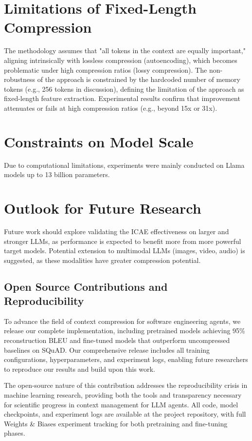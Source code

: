 \section{Limitations of Fixed-Length Compression}

The methodology assumes that "all tokens in the context are equally important," aligning intrinsically with lossless compression (autoencoding), which becomes problematic under high compression ratios (lossy compression).
The non-robustness of the approach is constrained by the hardcoded number of memory tokens (e.g., 256 tokens in discussion), defining the limitation of the approach as fixed-length feature extraction.
Experimental results confirm that improvement attenuates or fails at high compression ratios (e.g., beyond 15x or 31x).


\section{Constraints on Model Scale}

Due to computational limitations, experiments were mainly conducted on Llama models up to 13 billion parameters.


\section{Outlook for Future Research}

Future work should explore validating the ICAE \cite{ge_-context_2024} effectiveness on larger and stronger LLMs, as performance is expected to benefit more from more powerful target models.
Potential extension to multimodal LLMs (images, video, audio) is suggested, as these modalities have greater compression potential.

\subsection{Open Source Contributions and Reproducibility}

To advance the field of context compression for software engineering agents, we release our complete implementation, including pretrained models achieving 95\% reconstruction BLEU and fine-tuned models that outperform uncompressed baselines on SQuAD. Our comprehensive release includes all training configurations, hyperparameters, and experiment logs, enabling future researchers to reproduce our results and build upon this work.

The open-source nature of this contribution addresses the reproducibility crisis in machine learning research, providing both the tools and transparency necessary for scientific progress in context management for LLM agents. All code, model checkpoints, and experiment logs are available at the project repository, with full Weights \& Biases experiment tracking for both pretraining and fine-tuning phases.
